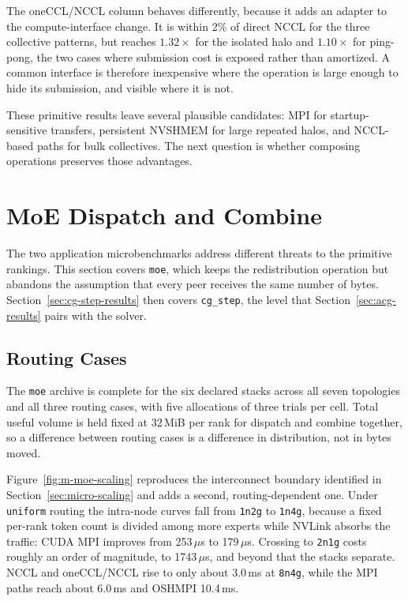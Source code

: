 The oneCCL/NCCL column behaves differently, because it adds an adapter to the compute-interface change. It is within 2\% of direct NCCL for the three collective patterns, but reaches $1.32\times$ for the isolated halo and $1.10\times$ for ping-pong, the two cases where submission cost is exposed rather than amortized. A common interface is therefore inexpensive where the operation is large enough to hide its submission, and visible where it is not.

These primitive results leave several plausible candidates: MPI for startup-sensitive transfers, persistent NVSHMEM for large repeated halos, and NCCL-based paths for bulk collectives. The next question is whether composing operations preserves those advantages.

\section{MoE Dispatch and Combine}\label{sec:moe-results}

The two application microbenchmarks address different threats to the primitive rankings. This section covers \texttt{moe}, which keeps the redistribution operation but abandons the assumption that every peer receives the same number of bytes. Section~\ref{sec:cg-step-results} then covers \texttt{cg\_step}, the level that Section~\ref{sec:acg-results} pairs with the solver.

\subsection{Routing Cases}

The \texttt{moe} archive is complete for the six declared stacks across all seven topologies and all three routing cases, with five allocations of three trials per cell. Total useful volume is held fixed at 32\,MiB per rank for dispatch and combine together, so a difference between routing cases is a difference in distribution, not in bytes moved.

Figure~\ref{fig:m-moe-scaling} reproduces the interconnect boundary identified in Section~\ref{sec:micro-scaling} and adds a second, routing-dependent one. Under \texttt{uniform} routing the intra-node curves fall from \texttt{1n2g} to \texttt{1n4g}, because a fixed per-rank token count is divided among more experts while NVLink absorbs the traffic: CUDA MPI improves from 253\,$\mu$s to 179\,$\mu$s. Crossing to \texttt{2n1g} costs roughly an order of magnitude, to 1743\,$\mu$s, and beyond that the stacks separate. NCCL and oneCCL/NCCL rise to only about 3.0\,ms at \texttt{8n4g}, while the MPI paths reach about 6.0\,ms and OSHMPI 10.4\,ms.

